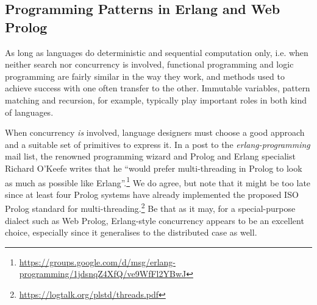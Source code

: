 \documentclass{tlp}
\begin{document}
\subsection{Programming Patterns in Erlang and Web Prolog}\label{sec:porting-erlang}

As long as languages do deterministic and sequential computation only, i.e. when neither search nor concurrency is involved, functional programming and logic programming are fairly similar in the way they work, and methods used to achieve success with one often transfer to the other. Immutable variables, pattern matching and recursion, for example, typically play important roles in both kind of languages.




When concurrency \textit{is} involved, language designers must choose a good approach and a suitable set of primitives to express it. In a post to the \textit{erlang-programming} mail list, the renowned programming wizard and Prolog and Erlang specialist Richard O'Keefe writes that he ``would prefer multi-threading in Prolog to look as much as possible like Erlang''.\footnote{\url{https://groups.google.com/d/msg/erlang-programming/1jdsnqZ4XfQ/ve9WfFl2YBwJ}} We do agree, but note that it might be too late since at least four Prolog systems have already implemented the proposed ISO Prolog standard for multi-threading.\footnote{\url{https://logtalk.org/plstd/threads.pdf}} Be that as it may, for a special-purpose dialect such as Web Prolog, Erlang-style concurrency appears to be an excellent choice, especially since it generalises to the distributed case as well.
\end{document}
